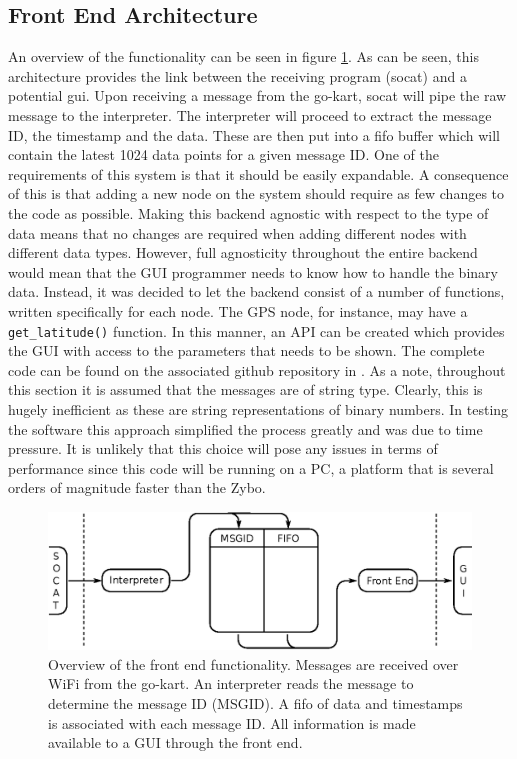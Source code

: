 \subsection{Front End Architecture}\label{sec:frontend}
An overview of the functionality can be seen in figure \ref{fig:backendconcept}.
As can be seen, this architecture provides the link between the receiving program (socat) and a potential \acs{gui}.
Upon receiving a message from the go-kart, socat will pipe the raw message to the interpreter.
The interpreter will proceed to extract the message ID, the timestamp and the data.
These are then put into a fifo buffer which will contain the latest 1024 data points for a given message ID.
One of the requirements of this system is that it should be easily expandable.
A consequence of this is that adding a new node on the system should require as few changes to the code as possible.
Making this backend agnostic with respect to the type of data means that no changes are required when adding different nodes with different data types.
However, full agnosticity throughout the entire backend would mean that the GUI programmer needs to know how to handle the binary data.
Instead, it was decided to let the backend consist of a number of functions, written specifically for each node.
The GPS node, for instance, may have a \texttt{get\_latitude()} function.
In this manner, an API can be created which provides the GUI with access to the parameters that needs to be shown.
The complete code can be found on the associated github repository in .
As a note, throughout this section it is assumed that the messages are of string type.
Clearly, this is hugely inefficient as these are string representations of binary numbers.
In testing the software this approach simplified the process greatly and was due to time pressure.
It is unlikely that this choice will pose any issues in terms of performance since this code will be running on a PC, a platform that is several orders of magnitude faster than the Zybo.

\begin{figure}
	\includegraphics[width=\linewidth]{graphics/backend_concept}
	\caption[Overview of the front end functionality.]{Overview of the front end functionality. 
	Messages are received over WiFi from the go-kart. 
	An interpreter reads the message to determine the message ID (MSGID). A fifo of data and timestamps is associated with each message ID. 
	All information is made available to a GUI through the front end.}
	\label{fig:backendconcept}
\end{figure}

